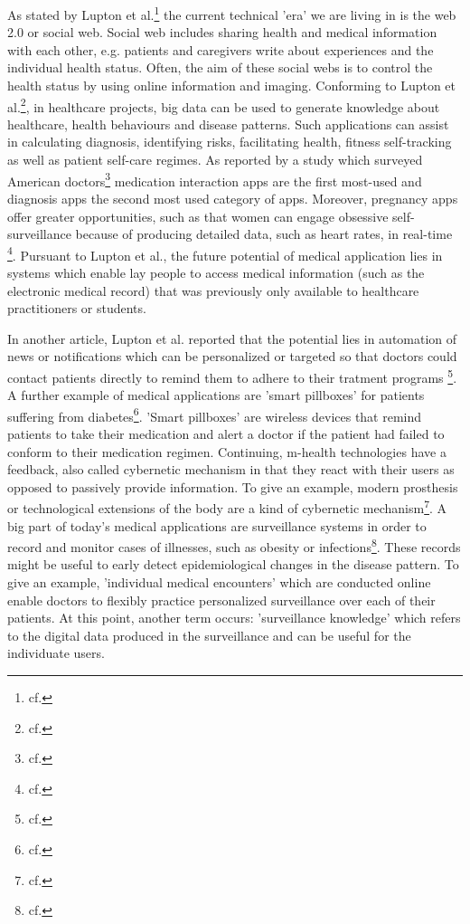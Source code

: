 As stated by Lupton et al.\footnote{cf.\autocite{lupton_apps}} the current technical 'era' we are living in is the web 2.0 or social web. Social web includes sharing health and medical information with each other, e.g. patients and caregivers write about experiences and the individual health status. Often, the aim of these social webs is to control the health status by using online information and imaging.
Conforming to Lupton et al.\footnote{cf.\autocite{lupton_apps}}, in healthcare projects, big data can be used to generate knowledge about healthcare, health behaviours and disease patterns. Such applications can assist in calculating diagnosis, identifying risks, facilitating health, fitness self-tracking as well as patient self-care regimes.
As reported by a study which surveyed American doctors\footnote{cf.\autocite{lupton_apps}} medication interaction apps are the first most-used and diagnosis apps the second most used category of apps.
Moreover, pregnancy apps offer greater opportunities, such as that women can engage obsessive self-surveillance because of producing detailed data, such as heart rates, in real-time \footnote{cf.\autocite{lupton_apps}}. Pursuant to Lupton et al., the future potential of medical application lies in systems which enable lay people to access medical information (such as the electronic medical record) that was previously only available to healthcare practitioners or students.

In another article, Lupton et al. reported that the potential lies in automation of news or notifications which can be personalized or targeted so that doctors could contact patients directly to remind them to adhere to their tratment programs \footnote{cf.\autocite{lupton_mhealth}}.
A further example of medical applications are 'smart pillboxes' for patients suffering from diabetes\footnote{cf.\autocite{lupton_mhealth}}. 'Smart pillboxes' are wireless devices that remind patients to take their medication and alert a doctor if the patient had failed to conform to their medication regimen.
Continuing, \ac{m-health} technologies have a feedback, also called cybernetic mechanism in that they react with their users as opposed to passively provide information. To give an example, modern prosthesis or technological extensions of the body are a kind of cybernetic mechanism\footnote{cf.\autocite{lupton_mhealth}}. 
A big part of today's medical applications are surveillance systems in order to record and monitor cases of illnesses, such as obesity or infections\footnote{cf.\autocite{lupton_mhealth}}. These records might be useful to early detect epidemiological changes in the disease pattern. To give an example, 'individual medical encounters' which are conducted online enable doctors to flexibly practice personalized surveillance over each of their patients. At this point, another term occurs: 'surveillance knowledge' which refers to the digital data produced in the surveillance and can be useful for the individuate users.

